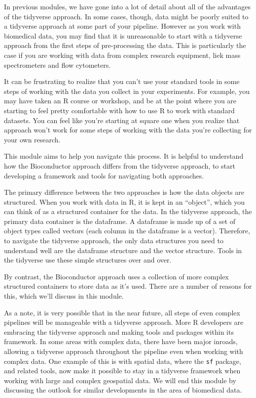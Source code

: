 \documentclass[]{tufte-book}
\begin{document}
In previous modules, we have gone into a lot of detail about all of the
advantages of the tidyverse approach. In some cases, though, data might be
poorly suited to a tidyverse approach at some part of your pipeline. However as
you work with biomedical data, you may find that it is unreasonable to start
with a tidyverse approach from the first steps of pre-processing the data. This
is particularly the case if you are working with data from complex research
equipment, liek mass spectrometers and flow cytometers.

It can be frustrating to realize that you can't use your standard tools
in some steps of working with the data you collect in your experiments.
For example, you may have taken an R course or workshop, and be at the
point where you are starting to feel pretty comfortable with how to use
R to work with standard datasets. You can feel like you're starting at
square one when you realize that approach won't work for some steps of
working with the data you're collecting for your own research.

This module aims to help you navigate this process.
It is helpful to understand how the Bioconductor approach differs from
the tidyverse approach, to start developing a framework and tools for
navigating both approaches.

The primary difference between the two approaches is how the data objects
are structured. When you work with data in R, it is kept in an ``object'',
which you can think of as a structured container for the data. In the
tidyverse approach, the primary data container is the dataframe. A
dataframe is made up of a set of object types called vectors (each column
in the dataframe is a vector). Therefore, to navigate the tidyverse
approach, the only data structures you need to understand well are the
dataframe structure and the vector structure. Tools in the tidyverse
use these simple structures over and over.

By contrast, the Bioconductor approach uses a collection of more complex
structured containers to store data as it's used. There are a number of
reasons for this, which we'll discuss in this module.

As a note, it is very possible that in the near future, all steps of even
complex pipelines will be manageable with a tidyverse approach. More
R developers are embracing the tidyverse approach and making tools and packages
within its framework. In some areas with complex data, there have been
major inroads, allowing a tidyverse approach throughout the pipeline even
when working with complex data. One example of this is with spatial data,
where the \texttt{sf} package, and related tools, now make it possible to stay in
a tidyverse framework when working with large and complex geospatial data.
We will end this module by discussing the outlook for similar developments
in the area of biomedical data.
\end{document}
